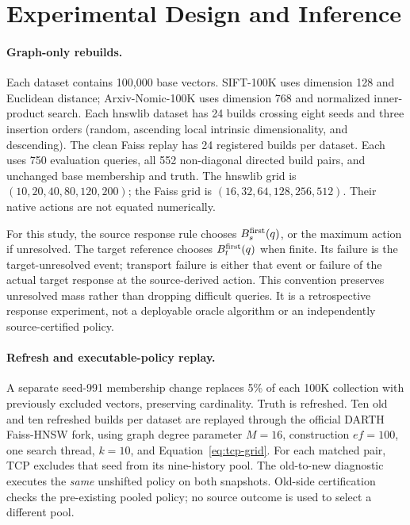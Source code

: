 \section{Experimental Design and Inference}
\label{sec:methodology}

\paragraph{Graph-only rebuilds.}
Each dataset contains 100,000 base vectors. SIFT-100K uses dimension 128 and Euclidean distance; Arxiv-Nomic-100K uses dimension 768 and normalized inner-product search. Each hnswlib dataset has 24 builds crossing eight seeds and three insertion orders (random, ascending local intrinsic dimensionality, and descending). The clean Faiss replay has 24 registered builds per dataset. Each uses 750 evaluation queries, all 552 non-diagonal directed build pairs, and unchanged base membership and truth. The hnswlib grid is $(10,20,40,80,120,200)$; the Faiss grid is $(16,32,64,128,256,512)$. Their native actions are not equated numerically.

For this study, the source response rule chooses $B_s^{\rm first}(q)$, or the maximum action if unresolved. The target reference chooses $B_t^{\rm first}(q)$ when finite. Its failure is the target-unresolved event; transport failure is either that event or failure of the actual target response at the source-derived action. This convention preserves unresolved mass rather than dropping difficult queries. It is a retrospective response experiment, not a deployable oracle algorithm or an independently source-certified policy.

\paragraph{Refresh and executable-policy replay.}
A separate seed-991 membership change replaces 5\% of each 100K collection with previously excluded vectors, preserving cardinality. Truth is refreshed. Ten old and ten refreshed builds per dataset are replayed through the official DARTH Faiss-HNSW fork, using graph degree parameter $M=16$, construction $ef=100$, one search thread, $k=10$, and Equation~\eqref{eq:tcp-grid}. For each matched pair, TCP excludes that seed from its nine-history pool. The old-to-new diagnostic executes the \emph{same} unshifted policy on both snapshots. Old-side certification checks the pre-existing pooled policy; no source outcome is used to select a different pool.

